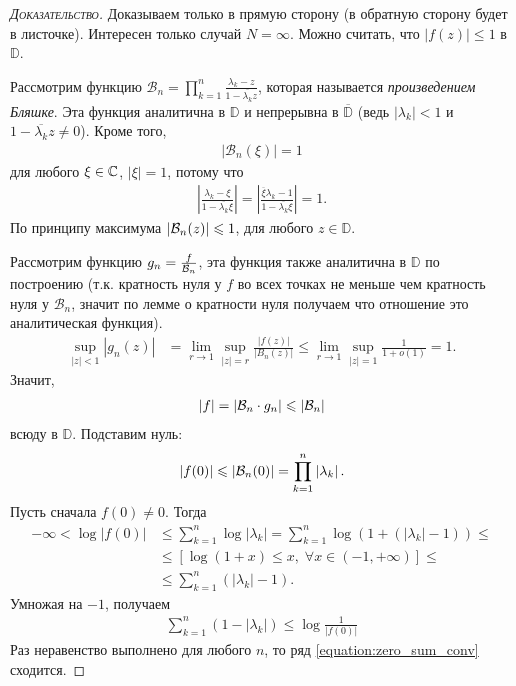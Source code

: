 \documentclass[../complex-analysis.tex]{subfiles}
\begin{document}
\begin{proof}[\normalfont\textsc{Доказательство}]
 Доказываем только в прямую сторону (в обратную сторону будет в листочке). Интересен только случай $ N = \infty $. Можно считать, что $ \left| f(z) \right| \leqslant 1$ в $ \mathbb D $.

 Рассмотрим функцию $ \mathcal B_n = \prod_{k=1}^{n} \frac{\lambda_k - z}{1 - \overline{\lambda_k}z} $, которая называется \textit{произведением Бляшке}. Эта функция аналитична в $ \mathbb D  $ и непрерывна в $ \overline {\mathbb D} $ (ведь $ \left| \lambda_k \right| < 1  $ и $ 1 - \overline{\lambda_k}z \neq 0 $). Кроме того,
 \begin{align*}
  \left| \mathcal B_n(\xi) \right| = 1
 \end{align*} для любого $ \xi \in \mathbb{C} $, $ \left| \xi \right| = 1 $, потому что
 \begin{align*}
  \left| \frac{\lambda_k - \xi}{1 - \overline{\lambda_k}\xi} \right| = \left| \frac{\overline \xi \lambda_k - 1}{1 - \overline{\lambda_k} \xi} \right| = 1.
 \end{align*} По принципу максимума $ \left| \mathcal{B}_n(z) \right| \leqslant 1$, для любого $z \in \mathbb D $.

 Рассмотрим функцию $ g_n = \frac{f}{\mathcal{B}_n} $, эта функция также аналитична в $ \mathbb D $ по построению (т.к. кратность нуля у $f$ во всех точках не меньше чем кратность нуля у $\mathcal B_n$, значит по лемме о кратности нуля получаем что отношение это аналитическая функция).
 \begin{align*}
 \sup_{\left| z \right| < 1} \left| g_n(z) \right| &= \lim_{r \to 1} \sup_{\left| z \right| = r} \frac{\left|f(z) \right|}{\left| B_n(z) \right|} \leqslant \lim_{r \to 1} \sup_{|z| = 1} \frac{1}{1 + o(1)} = 1.
 \end{align*} Значит,
 \begin{align*}
  \left| f \right| = \left| \mathcal B_n \cdot g_n \right| \leqslant \left| \mathcal{B}_n \right|
 \end{align*} всюду в $ \mathbb D $. Подставим нуль:
 \begin{align*}
  \left| f(0) \right| \leqslant \left| \mathcal{B}_n(0) \right| = \prod_{k=1}^{n}\left| \lambda_k \right|.
 \end{align*} Пусть сначала $ f(0) \neq 0 $. Тогда
 \begin{align*}
	-\infty < \log \left| f(0) \right| &\leqslant \sum_{k=1}^{n} \log \left| \lambda_k \right| = \sum_{k=1}^{n} \log (1 + (\left| \lambda_k \right| - 1)) \leqslant \\
	&\leqslant [\log(1+x) \leqslant x, \; \forall  x \in (-1, +\infty)  ] \leqslant \\
	&\leqslant \sum_{k=1}^{n}\left( \left| \lambda_k \right| - 1 \right).
 \end{align*} Умножая на $ -1 $, получаем
 \begin{align*}
  \sum_{k=1}^{n} \left( 1 - \left| \lambda_k \right| \right) \leqslant \log \frac{1}{\left| f(0) \right|}
 \end{align*} Раз неравенство выполнено для любого $ n $, то ряд  \eqref{equation:zero_sum_conv} сходится.


\end{proof}
\end{document}
